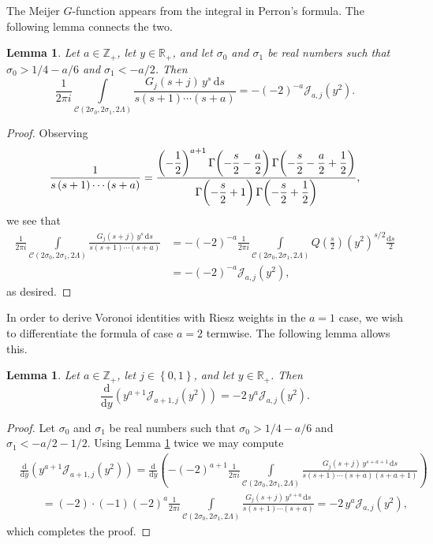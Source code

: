 \documentclass[a4paper,10pt,twoside]{amsart}
\newtheorem{lemma}[theorem]{Lemma}
\theoremstyle{definition}
\numberwithin{equation}{section}
\renewcommand\:{\colon}
\begin{document}
\noindent The Meijer $G$-function appears from the integral in Perron's formula. The following lemma connects the two.
\begin{lemma}\label{perron-meijer}
Let $a\in\mathbb Z_+$, let $y\in\mathbb R_+$, and let $\sigma_0$ and $\sigma_1$ be real numbers such that $\sigma_0>1/4-a/6$ and $\sigma_1<-a/2$. Then
\[\frac1{2\pi i}\int\limits_{\mathscr C(2\sigma_0,2\sigma_1,2\Lambda)}\frac{G_j(s+j)\,y^s\,\mathrm ds}{s\left(s+1\right)\cdots\left(s+a\right)}
=-\left(-2\right)^{-a}\mathscr J_{a,j}(y^2).\]
\end{lemma}

\begin{proof}
Observing 
\[\frac1{s\left(s+1\right)\cdots\left(s+a\right)}
=\frac{\displaystyle{\left(-\frac12\right)^{a+1}\Gamma\!\left(-\frac{s\vphantom1}2-\frac a2\right)\Gamma\!\left(-\frac{s\vphantom1}2-\frac a2+\frac12\right)}}{\displaystyle{\Gamma\!\left(-\frac{s\vphantom1}2+1\right)\Gamma\!\left(-\frac s2+\frac12\right)}},\]
we see that
\begin{align*}
\frac1{2\pi i}\int\limits_{\mathscr C(2\sigma_0,2\sigma_1,2\Lambda)}\frac{G_j(s+j)\,y^s\,\mathrm ds}{s\left(s+1\right)\cdots\left(s+a\right)}
&=-\left(-2\right)^{-a}\frac1{2\pi i}\int\limits_{\mathscr C(2\sigma_0,2\sigma_1,2\Lambda)}Q\!\left(\frac s2\right)\left(y^2\right)^{s/2}\frac{\mathrm ds}2\\
&=-\left(-2\right)^{-a}\mathscr J_{a,j}(y^2),
\end{align*}
as desired.
\end{proof}

\noindent In order to derive Voronoi identities with Riesz weights in the $a=1$ case, we wish to differentiate the formula of case $a=2$ termwise. The following lemma allows this.
\begin{lemma}\label{derivative-of-j}
Let $a\in\mathbb Z_+$, let $j\in\left\{0,1\right\}$, and let $y\in\mathbb R_+$. Then
\[\frac{\mathrm d}{\mathrm dy}\left(y^{a+1}\mathscr J_{a+1,j}(y^2)\right)
=-2\,y^a\mathscr J_{a,j}(y^2).\]
\end{lemma}
  
\begin{proof}
Let $\sigma_0$ and $\sigma_1$ be real numbers such that $\sigma_0>1/4-a/6$ and $\sigma_1<-a/2-1/2$.
Using Lemma \ref{perron-meijer} twice we may compute
\begin{align*}
&\frac{\mathrm d}{\mathrm dy}\left(y^{a+1}\mathscr J_{a+1,j}(y^2)\right)
=\frac{\mathrm d}{\mathrm dy}\left(-\left(-2\right)^{a+1}\frac1{2\pi i}\int\limits_{\mathscr C(2\sigma_0,2\sigma_1,2\Lambda)}\frac{G_j(s+j)\,y^{s+a+1}\,\mathrm ds}{s\left(s+1\right)\cdots\left(s+a\right)\left(s+a+1\right)}\right)\\
&\qquad=\left(-2\right)\cdot\left(-1\right)\left(-2\right)^{a}
\frac1{2\pi i}\int\limits_{\mathscr C(2\sigma_0,2\sigma_1,2\Lambda)}\frac{G_j(s+j)\,y^{s+a}\,\mathrm ds}{s\left(s+1\right)\cdots\left(s+a\right)}
=-2\,y^a\mathscr J_{a,j}(y^2),
\end{align*}
which completes the proof. 
\end{proof}
\end{document}

